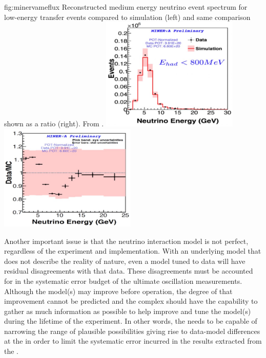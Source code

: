 \begin{dunefigure}{fig:minervameflux}
{Reconstructed  medium energy  neutrino event spectrum for low-energy transfer events compared to simulation (left) and same comparison shown as a ratio (right). From \cite{JenaNUINT2018}.}
\includegraphics[width=0.49\textwidth]{graphics/minerva_enu.jpg}
\includegraphics[width=0.49\textwidth]{graphics/minerva_enuratio.jpg}
\end{dunefigure}

Another important issue is that the neutrino interaction model is not perfect, regardless of the experiment and implementation.  With an underlying model that does not describe the reality of nature, even a model tuned to   data will have residual disagreements with that data.  These disagreements must be accounted for in the systematic error budget of the ultimate oscillation measurements.  Although the model(s) may improve before  operation, the degree of that improvement cannot be predicted and the    complex should have the capability to gather as much information as possible to help improve and tune the model(s) during the lifetime of the experiment.  In other words, the   needs to be capable of narrowing the range of plausible possibilities giving rise to data-model differences at the   in order to limit the systematic error incurred in the results extracted from the  .   


